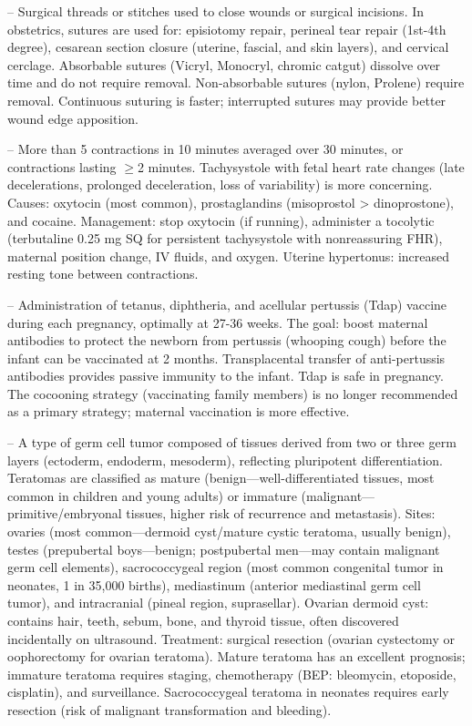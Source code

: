 -- Surgical threads or stitches used to close wounds or surgical incisions. In obstetrics, sutures are used for: episiotomy repair, perineal tear repair (1st-4th degree), cesarean section closure (uterine, fascial, and skin layers), and cervical cerclage. Absorbable sutures (Vicryl, Monocryl, chromic catgut) dissolve over time and do not require removal. Non-absorbable sutures (nylon, Prolene) require removal. Continuous suturing is faster; interrupted sutures may provide better wound edge apposition.

-- More than 5 contractions in 10 minutes averaged over 30 minutes, or contractions lasting \(\ge\)2 minutes. Tachysystole with fetal heart rate changes (late decelerations, prolonged deceleration, loss of variability) is more concerning. Causes: oxytocin (most common), prostaglandins (misoprostol > dinoprostone), and cocaine. Management: stop oxytocin (if running), administer a tocolytic (terbutaline 0.25 mg SQ for persistent tachysystole with nonreassuring FHR), maternal position change, IV fluids, and oxygen. Uterine hypertonus: increased resting tone between contractions.

-- Administration of tetanus, diphtheria, and acellular pertussis (Tdap) vaccine during each pregnancy, optimally at 27-36 weeks. The goal: boost maternal antibodies to protect the newborn from pertussis (whooping cough) before the infant can be vaccinated at 2 months. Transplacental transfer of anti-pertussis antibodies provides passive immunity to the infant. Tdap is safe in pregnancy. The cocooning strategy (vaccinating family members) is no longer recommended as a primary strategy; maternal vaccination is more effective.

-- A type of germ cell tumor composed of tissues derived from two or three germ layers (ectoderm, endoderm, mesoderm), reflecting pluripotent differentiation. Teratomas are classified as mature (benign—well-differentiated tissues, most common in children and young adults) or immature (malignant—primitive/embryonal tissues, higher risk of recurrence and metastasis). Sites: ovaries (most common—dermoid cyst/mature cystic teratoma, usually benign), testes (prepubertal boys—benign; postpubertal men—may contain malignant germ cell elements), sacrococcygeal region (most common congenital tumor in neonates, 1 in 35,000 births), mediastinum (anterior mediastinal germ cell tumor), and intracranial (pineal region, suprasellar). Ovarian dermoid cyst: contains hair, teeth, sebum, bone, and thyroid tissue, often discovered incidentally on ultrasound. Treatment: surgical resection (ovarian cystectomy or oophorectomy for ovarian teratoma). Mature teratoma has an excellent prognosis; immature teratoma requires staging, chemotherapy (BEP: bleomycin, etoposide, cisplatin), and surveillance. Sacrococcygeal teratoma in neonates requires early resection (risk of malignant transformation and bleeding).

